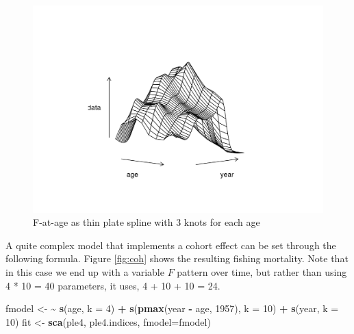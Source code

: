 \documentclass[
]{book}
\newenvironment{Shaded}{\begin{snugshade}}{\end{snugshade}}
\newcommand{\AttributeTok}[1]{\textcolor[rgb]{0.13,0.29,0.53}{#1}}
\newcommand{\DecValTok}[1]{\textcolor[rgb]{0.00,0.00,0.81}{#1}}
\newcommand{\ErrorTok}[1]{\textcolor[rgb]{0.64,0.00,0.00}{\textbf{#1}}}
\newcommand{\FunctionTok}[1]{\textcolor[rgb]{0.13,0.29,0.53}{\textbf{#1}}}
\newcommand{\NormalTok}[1]{#1}
\newcommand{\OtherTok}[1]{\textcolor[rgb]{0.56,0.35,0.01}{#1}}
\newcommand{\SpecialCharTok}[1]{\textcolor[rgb]{0.81,0.36,0.00}{\textbf{#1}}}
\begin{document}
\begin{figure}
\centering
\includegraphics{_bookdown_files/_main_files/figure-html/ageind-1.png}
\caption{\label{fig:ageind}F-at-age as thin plate spline with 3 knots for each age}
\end{figure}

A quite complex model that implements a cohort effect can be set through the following formula. Figure \ref{fig:coh} shows the resulting fishing mortality. Note that in this case we end up with a variable \(F\) pattern over time, but rather than using 4 * 10 = 40 parameters, it uses, 4 + 10 + 10 = 24.

\begin{Shaded}
\begin{Highlighting}[]
\NormalTok{fmodel }\OtherTok{\textless{}{-}} \ErrorTok{\textasciitilde{}} \FunctionTok{s}\NormalTok{(age, }\AttributeTok{k =} \DecValTok{4}\NormalTok{) }\SpecialCharTok{+} \FunctionTok{s}\NormalTok{(}\FunctionTok{pmax}\NormalTok{(year }\SpecialCharTok{{-}}\NormalTok{ age, }\DecValTok{1957}\NormalTok{), }\AttributeTok{k =} \DecValTok{10}\NormalTok{) }\SpecialCharTok{+} \FunctionTok{s}\NormalTok{(year, }\AttributeTok{k =} \DecValTok{10}\NormalTok{)}
\NormalTok{fit }\OtherTok{\textless{}{-}} \FunctionTok{sca}\NormalTok{(ple4, ple4.indices, }\AttributeTok{fmodel=}\NormalTok{fmodel)}
\end{Highlighting}
\end{Shaded}
\end{document}
